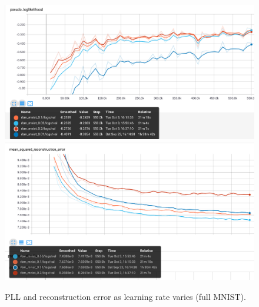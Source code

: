 \begin{figure}[h]
\begin{mdframed}
\centering
\includegraphics[width=5.6in]{rbm-mnist/pll_lr.png}
\\[2em]
\includegraphics[width=5.6in]{rbm-mnist/msre_lr.png}
\caption{PLL and reconstruction error as learning rate varies (full MNIST).}
\end{mdframed}
\end{figure}

\clearpage


